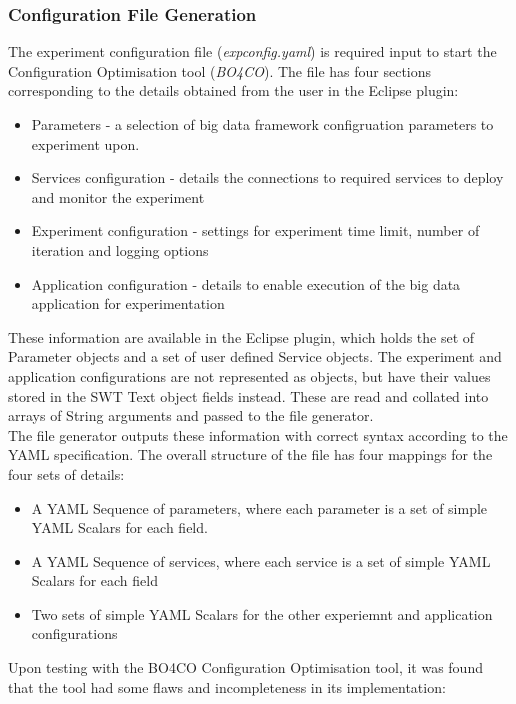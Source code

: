 \newpage
\subsubsection{Configuration File Generation}
The experiment configuration file (\textit{expconfig.yaml}) is required input to start the Configuration Optimisation tool (\textit{BO4CO}). The file has four sections corresponding to the details obtained from the user in the Eclipse plugin:
\begin{itemize}
\item Parameters - a selection of big data framework configruation parameters to experiment upon. 
\item Services configuration - details the connections to required services to deploy and monitor the experiment
\item Experiment configuration - settings for experiment time limit, number of iteration and logging options
\item Application configuration - details to enable execution of the big data application for experimentation
\end{itemize}
These information are available in the Eclipse plugin, which holds the set of Parameter objects and a set of user defined Service objects. The experiment and application configurations are not represented as objects, but have their values stored in the SWT Text object fields instead. These are read and collated into arrays of String arguments and passed to the file generator.\\
The file generator outputs these information with correct syntax according to the YAML specification. The overall structure of the file has four mappings for the four sets of details:
\begin{itemize}
\item A YAML Sequence of parameters, where each parameter is a set of simple YAML Scalars for each field.
\item A YAML Sequence of services, where each service is a set of simple YAML Scalars for each field 
\item Two sets of simple YAML Scalars for the other experiemnt and application configurations 
\end{itemize}
Upon testing with the BO4CO Configuration Optimisation tool, it was found that the tool had some flaws and incompleteness in its implementation: 
